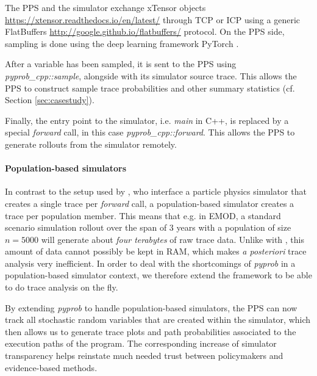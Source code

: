 \documentclass{article}
\begin{document}
The PPS and the simulator exchange xTensor objects \url{https://xtensor.readthedocs.io/en/latest/} through TCP or ICP using a generic FlatBuffers \url{http://google.github.io/flatbuffers/} protocol. On the PPS side, sampling is done using the deep learning framework PyTorch \cite{paszke2017automatic}.

After a variable has been sampled, it is sent to the PPS using \textit{pyprob\_cpp::sample}, alongside with its simulator source trace. This allows the PPS to construct sample trace probabilities and other summary statistics (cf. Section \ref{sec:casestudy}). 

Finally, the entry point to the simulator, i.e. \textit{main} in C++, is replaced by a special \textit{forward} call, in this case \textit{pyprob\_cpp::forward}.
This allows the PPS to generate rollouts from the simulator remotely. 

\paragraph{Population-based simulators} In contrast to the setup used by \cite{baydin2018efficient}, who interface a particle physics simulator that creates a single trace per \textit{forward} call, a population-based simulator creates a trace per population member. This means that e.g. in EMOD, a standard scenario simulation rollout over the span of $3$ years  
with a population of size $n=5000$ \cite{smith2008towards} will generate about \textit{four terabytes} of raw trace data. Unlike with \citep{baydin2018efficient}, this amount of data cannot possibly be kept in RAM, which makes \textit{a posteriori} trace analysis very inefficient. 
In order to deal with the shortcomings of \textit{pyprob} in a population-based simulator context, we therefore extend the framework to be able to do trace analysis on the fly.

By extending \textit{pyprob} to handle population-based simulators, the PPS can now track all stochastic random variables that are created within the simulator, which then allows us to generate trace plots and path probabilities associated to the execution paths of the program.
The corresponding increase of simulator transparency helps reinstate much needed trust between policymakers and evidence-based methods.
\end{document}
